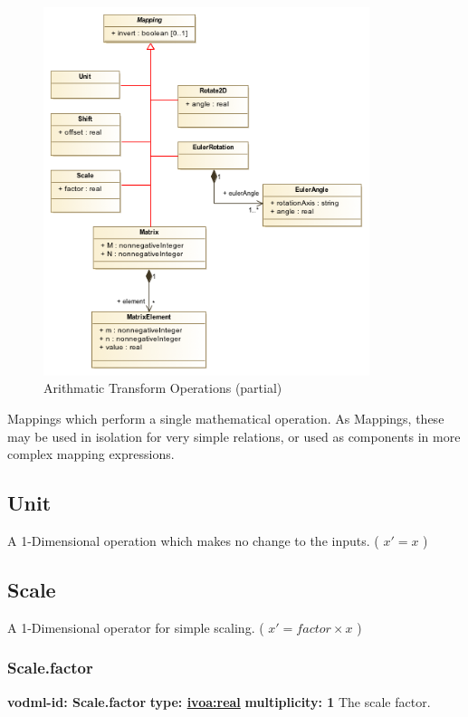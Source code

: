   \begin{figure}[h]
  \begin{center}
    \includegraphics[width=3.75in]{diagrams/basic_operations.png}
    \caption{Arithmatic Transform Operations (partial)}\label{fig:basicOps}
  \end{center}
  \end{figure}

  Mappings which perform a single mathematical operation. As Mappings, these may be used in isolation for very simple relations, or used as components in more complex mapping expressions.

  \subsection{Unit}
  \label{sect:Unit}
    A 1-Dimensional operation which makes no change to the inputs. ( $x' = x$ )

  \subsection{Scale}
  \label{sect:Scale}
    A 1-Dimensional operator for simple scaling. ( $x' = factor \times x$ )

    \subsubsection{Scale.factor}
      \textbf{vodml-id: Scale.factor} \newline
      \textbf{type: \hyperref[sect:ivoa]{ivoa:real}} \newline
      \textbf{multiplicity: 1} \newline 
      The scale factor.


